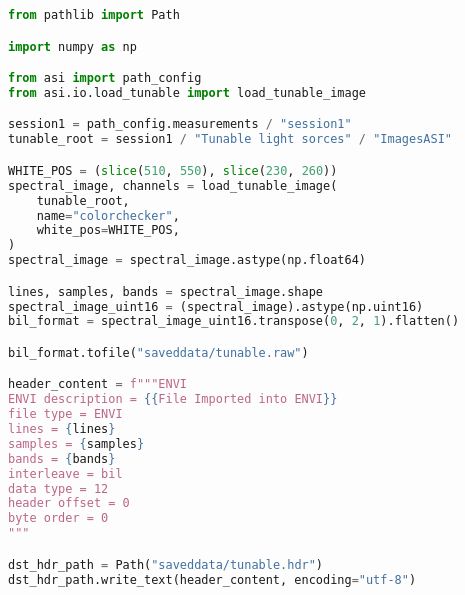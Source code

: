 \begin{lstlisting}[language=python, caption=Save tunable image as ENVI format, label={code:save-tunable}]
from pathlib import Path

import numpy as np

from asi import path_config
from asi.io.load_tunable import load_tunable_image

session1 = path_config.measurements / "session1"
tunable_root = session1 / "Tunable light sorces" / "ImagesASI"

WHITE_POS = (slice(510, 550), slice(230, 260))
spectral_image, channels = load_tunable_image(
    tunable_root,
    name="colorchecker",
    white_pos=WHITE_POS,
)
spectral_image = spectral_image.astype(np.float64)

lines, samples, bands = spectral_image.shape
spectral_image_uint16 = (spectral_image).astype(np.uint16)
bil_format = spectral_image_uint16.transpose(0, 2, 1).flatten()

bil_format.tofile("saveddata/tunable.raw")

header_content = f"""ENVI
ENVI description = {{File Imported into ENVI}}
file type = ENVI
lines = {lines}
samples = {samples}
bands = {bands}
interleave = bil
data type = 12
header offset = 0
byte order = 0
"""

dst_hdr_path = Path("saveddata/tunable.hdr")
dst_hdr_path.write_text(header_content, encoding="utf-8")
\end{lstlisting}
